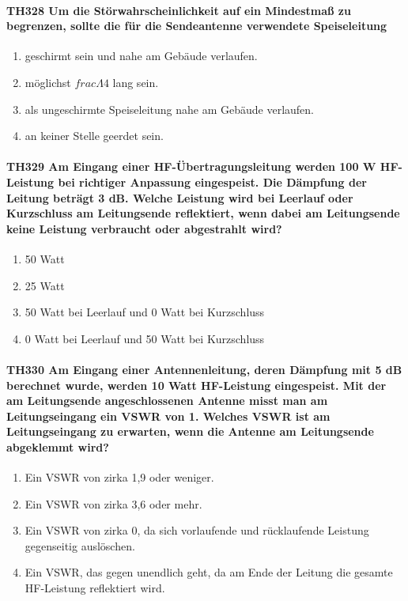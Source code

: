 \documentclass[8pt]{article}
\begin{document}
\paragraph*{TH328 Um die Störwahrscheinlichkeit auf ein Mindestmaß zu begrenzen, sollte die für die Sendeantenne verwendete Speiseleitung} 
\begin{enumerate}[nolistsep,label=\Alph*]
\item geschirmt sein und nahe am Gebäude verlaufen.
\item möglichst $frac{\Lambda}{4}$ lang sein.
\item als ungeschirmte Speiseleitung nahe am Gebäude verlaufen.
\item an keiner Stelle geerdet sein.
\end{enumerate}

\paragraph*{TH329 Am Eingang einer HF-Übertragungsleitung werden 100 W HF-Leistung bei richtiger Anpassung eingespeist. Die Dämpfung der Leitung beträgt 3 dB. Welche Leistung wird bei Leerlauf oder Kurzschluss am Leitungsende reflektiert, wenn dabei am Leitungsende keine Leistung verbraucht oder abgestrahlt wird?}
\begin{enumerate}[nolistsep,label=\Alph*]
\item 50 Watt
\item 25 Watt
\item 50 Watt bei Leerlauf und 0 Watt bei Kurzschluss
\item 0 Watt bei Leerlauf und 50 Watt bei Kurzschluss
\end{enumerate}

\paragraph*{TH330 Am Eingang einer Antennenleitung, deren Dämpfung mit 5 dB berechnet wurde, werden 10 Watt HF-Leistung eingespeist. Mit der am Leitungsende angeschlossenen Antenne misst man am Leitungseingang ein VSWR von 1. Welches VSWR ist am Leitungseingang zu erwarten, wenn die Antenne am Leitungsende abgeklemmt wird?} 
\begin{enumerate}[nolistsep,label=\Alph*]
\item Ein VSWR von zirka 1,9 oder weniger.
\item Ein VSWR von zirka 3,6 oder mehr.
\item Ein VSWR von zirka 0, da sich vorlaufende und rücklaufende Leistung gegenseitig auslöschen.
\item Ein VSWR, das gegen unendlich geht, da am Ende der Leitung die gesamte HF-Leistung reflektiert wird.
\end{enumerate}
\end{document}
